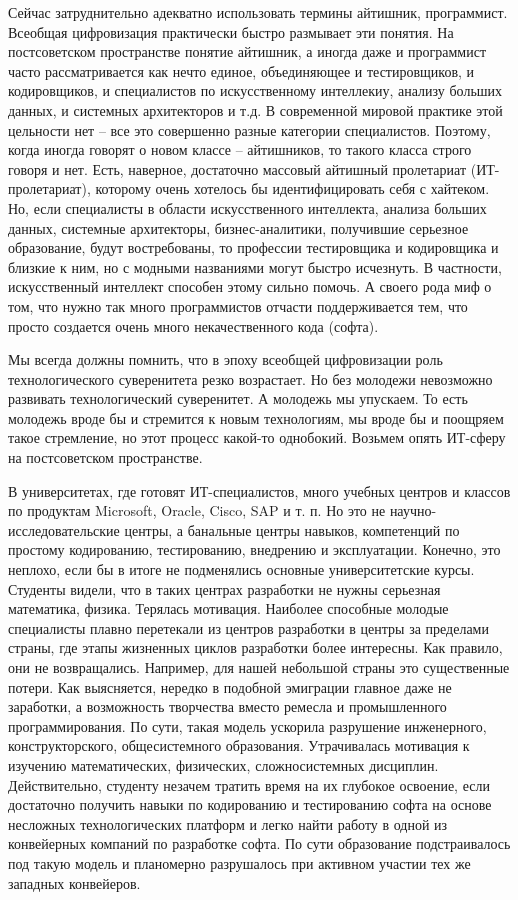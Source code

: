 \begin{partbacktext}
Сейчас затруднительно адекватно использовать термины айтишник, программист. Всеобщая цифровизация практически быстро размывает эти понятия. На постсоветском пространстве понятие айтишник, а иногда даже и программист часто рассматривается как нечто единое, объединяющее и тестировщиков, и кодировщиков, и специалистов по искусственному интеллекиу, анализу больших данных, и системных архитекторов и т.д. В современной мировой практике этой цельности нет -- все это совершенно разные категории специалистов. Поэтому, когда иногда говорят о новом классе -- айтишников, то такого класса строго говоря и нет. Есть, наверное, достаточно массовый айтишный пролетариат (ИТ-пролетариат), которому очень хотелось бы идентифицировать себя с хайтеком. Но, если специалисты в области искусственного интеллекта, анализа больших данных, системные архитекторы, бизнес-аналитики, получившие серьезное образование, будут востребованы, то профессии тестировщика и кодировщика и близкие к ним, но с модными названиями могут быстро исчезнуть. В частности, искусственный интеллект способен этому сильно помочь. А своего рода миф о том, что нужно так много программистов отчасти поддерживается тем, что просто создается очень много некачественного кода (софта).

Мы всегда должны помнить, что в эпоху всеобщей цифровизации роль технологического суверенитета резко возрастает. Но без молодежи невозможно развивать технологический суверенитет. А молодежь мы упускаем. То есть молодежь вроде бы и стремится к новым технологиям, мы вроде бы и поощряем такое стремление, но этот процесс какой-то однобокий. Возьмем опять ИТ-сферу на постсоветском пространстве.

В университетах, где готовят ИТ-специалистов, много учебных центров и классов по продуктам Microsoft, Oracle, Cisco, SAP и т. п. Но это не научно-исследовательские центры, а банальные центры навыков, компетенций по простому кодированию, тестированию, внедрению и эксплуатации. Конечно, это неплохо, если бы в итоге не подменялись основные университетские курсы. Студенты видели, что в таких центрах разработки не нужны серьезная математика, физика. Терялась мотивация. Наиболее способные молодые специалисты плавно перетекали из центров разработки в центры за пределами страны, где этапы жизненных циклов разработки более интересны. Как правило, они не возвращались. Например, для нашей небольшой страны это существенные потери. Как выясняется, нередко в подобной эмиграции главное даже не заработки, а возможность творчества вместо ремесла и промышленного программирования. По сути, такая модель ускорила разрушение инженерного, конструкторского, общесистемного образования. Утрачивалась мотивация к изучению математических, физических, сложносистемных дисциплин. Действительно, студенту незачем тратить время на их глубокое освоение, если достаточно получить навыки по кодированию и тестированию софта на основе несложных технологических платформ и легко найти работу в одной из конвейерных компаний по разработке софта. По сути образование подстраивалось под такую модель и планомерно разрушалось при активном участии тех же западных конвейеров.


\end{partbacktext}
